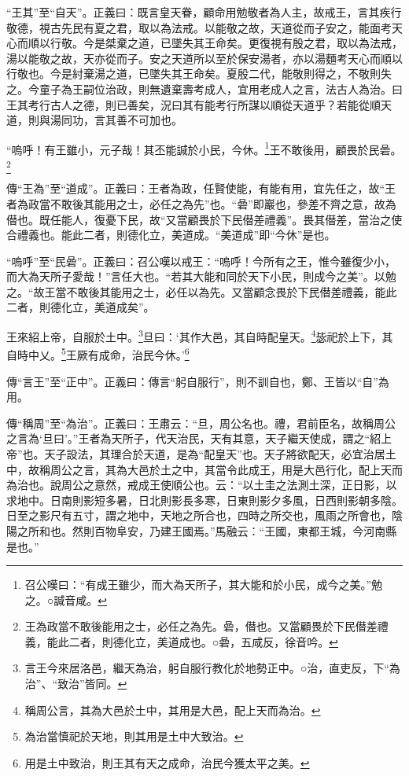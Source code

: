{\noindent\shu{}\fzkt “王其”至“自天”。正義曰：既言皇天眷，顧命用勉敬者為人主，故戒王，言其疾行敬德，視古先民有夏之君，取以為法戒。以能敬之故，天道從而子安之，能面考天心而順以行敬。今是桀棄之道，已墜失其王命矣。更復視有殷之君，取以為法戒，湯以能敬之故，天亦從而子。安之天道所以至於保安湯者，亦以湯麵考天心而順以行敬也。今是紂棄湯之道，已墜失其王命矣。夏殷二代，能敬則得之，不敬則失之。今童子為王嗣位治政，則無遺棄壽考成人，宜用老成人之言，法古人為治。曰王其考行古人之德，則已善矣，況曰其有能考行所謀以順從天道乎？若能從順天道，則與湯同功，言其善不可加也。 \par}

“嗚呼！有王雖小，元子哉！其丕能諴於小民，今休。\footnote{召公嘆曰：“有成王雖少，而大為天所子，其大能和於小民，成今之美。”勉之。○諴音咸。}王不敢後用，顧畏於民碞。\footnote{王為政當不敢後能用之士，必任之為先。碞，僣也。又當顧畏於下民僣差禮義，能此二者，則德化立，美道成也。○碞，五咸反，徐音吟。}


{\noindent\zhuan{}\fzbyks 傳“王為”至“道成”。正義曰：王者為政，任賢使能，有能有用，宜先任之，故“王者為政當不敢後其能用之士，必任之為先”也。“碞”即巖也，參差不齊之意，故為僣也。既任能人，復憂下民，故“又當顧畏於下民僣差禮義”。畏其僣差，當治之使合禮義也。能此二者，則德化立，美道成。“美道成”即“今休”是也。 \par}

{\noindent\shu{}\fzkt “嗚呼”至“民碞”。正義曰：召公嘆以戒王：“嗚呼！今所有之王，惟今雖復少小，而大為天所子愛哉！”言任大也。“若其大能和同於天下小民，則成今之美”。以勉之。“故王當不敢後其能用之士，必任以為先。又當顧念畏於下民僣差禮義，能此二者，則德化立，美道成矣”。 \par}

王來紹上帝，自服於土中。\footnote{言王今來居洛邑，繼天為治，躬自服行教化於地勢正中。○治，直吏反，下“為治”、“致治”皆同。}旦曰：‘其作大邑，其自時配皇天。\footnote{稱周公言，其為大邑於土中，其用是大邑，配上天而為治。}毖祀於上下，其自時中乂。\footnote{為治當慎祀於天地，則其用是土中大致治。}王厥有成命，治民今休。’\footnote{用是土中致治，則王其有天之成命，治民今獲太平之美。}


{\noindent\zhuan{}\fzbyks 傳“言王”至“正中”。正義曰：傳言“躬自服行”，則不訓自也，鄭、王皆以“自”為用。 \par}

{\noindent\zhuan{}\fzbyks 傳“稱周”至“為治”。正義曰：王肅云：“旦，周公名也。禮，君前臣名，故稱周公之言為‘旦曰’。”王者為天所子，代天治民，天有其意，天子繼天使成，謂之“紹上帝”也。天子設法，其理合於天道，是為“配皇天”也。天子將欲配天，必宜治居土中，故稱周公之言，其為大邑於土之中，其當令此成王，用是大邑行化，配上天而為治也。說周公之意然，戒成王使順公也。云：“以土圭之法測土深，正日影，以求地中。日南則影短多暑，日北則影長多寒，日東則影夕多風，日西則影朝多陰。日至之影尺有五寸，謂之地中，天地之所合也，四時之所交也，風雨之所會也，陰陽之所和也。然則百物阜安，乃建王國焉。”馬融云：“王國，東都王城，今河南縣是也。” \par}

